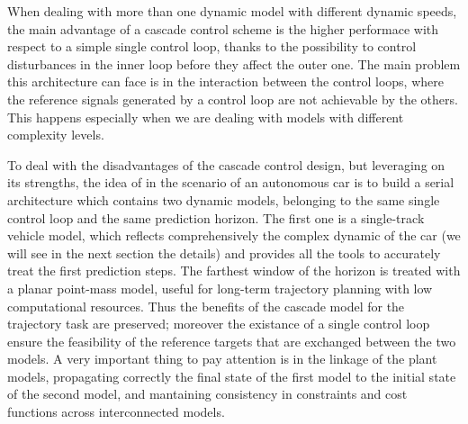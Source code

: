 \documentclass[a4paper, onecolumn, 12pt]{article}
\begin{document}
When dealing with more than one dynamic model with different dynamic speeds,
the main advantage of a cascade control scheme is the higher performace with respect
to a simple single control loop, thanks to the possibility to control disturbances
in the inner loop before they affect the outer one. The main problem this architecture
can face is in the interaction between the control loops, where the reference signals 
generated by a control loop are not achievable by the others. This happens especially
when we are dealing with models with different complexity levels.

To deal with the disadvantages of the cascade control design, but leveraging on its 
strengths, the idea of \cite{paper} in the scenario of an autonomous car is to build 
a serial architecture which contains two dynamic models, belonging to the same single
control loop and the same prediction horizon. The first one is a single-track vehicle
model, which reflects comprehensively the complex dynamic of the car (we will see in the 
next section the details) and provides all the tools to accurately treat the first
prediction steps. The farthest window of the horizon is treated with a planar point-mass 
model, useful for long-term trajectory planning with low computational resources.
Thus the benefits of the cascade model for the trajectory task are preserved; moreover
the existance of a single control loop ensure the feasibility of the reference targets
that are exchanged between the two models. A very important thing to pay attention is 
in the linkage of the plant models, propagating correctly the final state of the first
model to the initial state of the second model, and mantaining consistency in constraints
and cost functions across interconnected models.
\end{document}
